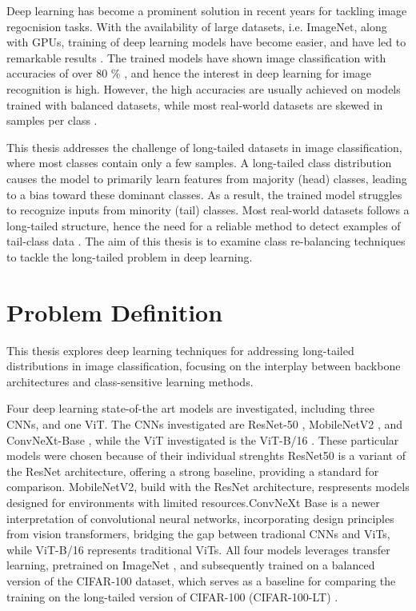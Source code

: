 \label{sec:introduction}

Deep learning has become a prominent solution in recent years for tackling image regocnision tasks. With the availability of large datasets, i.e. ImageNet, along with GPUs, training of deep learning models have become easier, and have led to remarkable results \cite{Goodfellow-et-al-2016}. The trained models have shown image classification with accuracies of over 80 \% \cite{he2015deepresiduallearningimage,dosovitskiy2021imageworth16x16words}, and hence the interest in deep learning for image recognition is high. However, the high accuracies are usually achieved on models trained with balanced datasets, while most real-world datasets are skewed in samples per class \cite{vanhorn2017deviltailsfinegrainedclassification,Buda_2018,liu2019largescalelongtailedrecognitionopen}.  

This thesis addresses the challenge of long-tailed datasets in image classification, where most classes contain only a few samples. A long-tailed class distribution causes the model to primarily learn features from majority (head) classes, leading to a bias toward these dominant classes. As a result, the trained model struggles to recognize inputs from minority (tail) classes. Most real-world datasets follows a long-tailed structure, hence the need for a reliable method to detect examples of tail-class data \cite{vanhorn2018inaturalistspeciesclassificationdetection,zhang2023deep}. The aim of this thesis is to examine class re-balancing techniques to tackle the long-tailed problem in deep learning.


\section{Problem Definition}
This thesis explores deep learning techniques for addressing long-tailed distributions in image classification, focusing on the interplay between backbone architectures and class-sensitive learning methods.

Four deep learning state-of-the art models are investigated, including three CNNs, and one ViT. The CNNs investigated are ResNet-50 \cite{he2015deepresiduallearningimage}, MobileNetV2 \cite{sandler2018mobilenetv2}, and ConvNeXt-Base \cite{liu2022convnet2020s}, while the ViT investigated is the ViT-B/16 \cite{dosovitskiy2021imageworth16x16words}. These particular models were chosen because of their individual strenghts  ResNet50 is a variant of the ResNet architecture, offering a strong baseline, providing a standard for comparison. MobileNetV2, build with the ResNet architecture, respresents models designed for environments with limited resources.ConvNeXt Base is a newer interpretation of convolutional neural networks, incorporating design principles from vision transformers, bridging the gap between tradional CNNs and ViTs, while ViT-B/16 represents traditional ViTs. All four models leverages transfer learning, pretrained on ImageNet \cite{ImageNet2009}, and subsequently trained on a balanced version of the CIFAR-100 \cite{krizhevsky2009learning} dataset, which serves as a baseline for comparing the training on the long-tailed version of CIFAR-100 (CIFAR-100-LT) \cite{cao2019learningimbalanceddatasetslabeldistributionaware}.  

